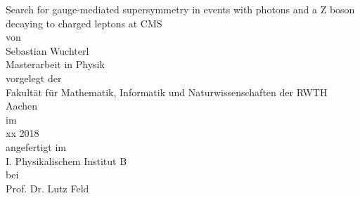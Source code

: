 \vspace{1.5cm}
\begin{center}
\Huge
Search for gauge-mediated supersymmetry in events with photons and a Z boson decaying to charged leptons at CMS
\\
\vspace{1.5cm}
\normalsize
von\\
\LARGE
Sebastian Wuchterl\\
\vspace{1.0cm}
\Large
Masterarbeit in Physik\\
\vspace{1.5cm}
\normalsize
vorgelegt der \\
\Large
Fakult\"at f\"ur Mathematik, Informatik und Naturwissenschaften der RWTH Aachen\\
\vspace{1.5cm}
\normalsize
im\\
\Large
xx 2018\\
\vspace{1.5cm}
\normalsize
angefertigt im\\
\Large
I. Physikalischem Institut B\\
\vspace{1.5cm}
\normalsize
bei\\
\Large
Prof. Dr. Lutz Feld
\end{center}
\thispagestyle{empty}
\restoregeometry
\newpage

